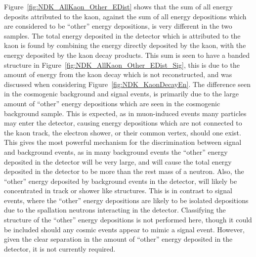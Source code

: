 Figure~\ref{fig:NDK_AllKaon_Other_EDist} shows that the sum of all energy deposits attributed to the kaon, against the sum of all energy depositions which are considered to be ``other'' energy depositions, is very different in the two samples. The total energy deposited in the detector which is attributed to the kaon is found by combining the energy directly deposited by the kaon, with the energy deposited by the kaon decay products. This sum is seen to have a banded structure in Figure~\ref{fig:NDK_AllKaon_Other_EDist_Sig}, this is due to the amount of energy from the kaon decay which is not reconstructed, and was discussed when considering Figure~\ref{fig:NDK_KaonDecayEn}. The difference seen in the cosmogenic background and signal events, is primarily due to the large amount of ``other'' energy depositions which are seen in the cosmogenic background sample. This is expected, as in muon-induced events many particles may enter the detector, causing energy depositions which are not connected to the kaon track, the electron shower, or their common vertex, should one exist. This gives the most powerful mechanism for the discrimination between signal and background events, as in many background events the ``other'' energy deposited in the detector will be very large, and will cause the total energy deposited in the detector to be more than the rest mass of a neutron. Also, the ``other'' energy deposited by background events in the detector, will likely be concentrated in track or shower like structures. This is in contrast to signal events, where the ``other'' energy depositions are likely to be isolated depositions due to the spallation neutrons interacting in the detector. Classifying the structure of the ``other'' energy depositions is not performed here, though it could be included should any cosmic events appear to mimic a signal event. However, given the clear separation in the amount of ``other'' energy deposited in the detector, it is not currently required. \\


